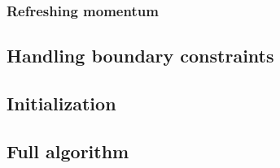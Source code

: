 \subsubsection{Refreshing momentum} \label{ss:momentum}

\subsection{Handling boundary constraints} \label{ss:constraints}

\subsection{Initialization} \label{ss:initialization}

\subsection{Full algorithm} \label{ss:algo}
